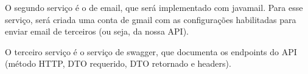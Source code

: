 O segundo serviço é o de email, que será implementado com javamail. Para esse serviço, será criada uma conta de gmail com as configurações habilitadas para enviar email de terceiros (ou seja, da nossa API).

O terceiro serviço é o serviço de swagger, que documenta os endpoints do API (método HTTP, DTO requerido, DTO retornado e headers).
